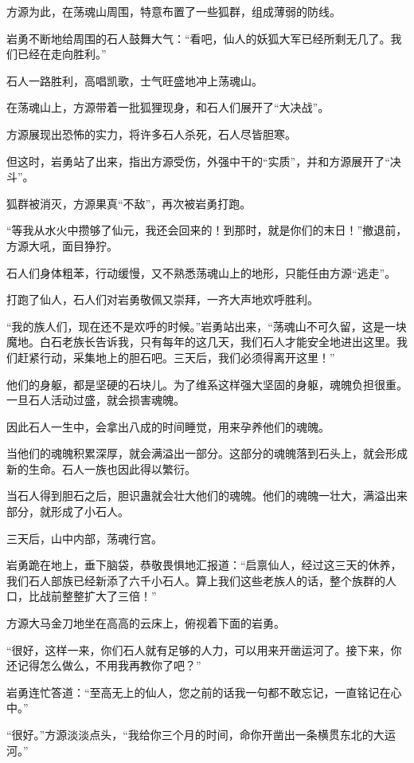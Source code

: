\begin{this_body}
方源为此，在荡魂山周围，特意布置了一些狐群，组成薄弱的防线。

岩勇不断地给周围的石人鼓舞大气：“看吧，仙人的妖狐大军已经所剩无几了。我们已经在走向胜利。”

石人一路胜利，高唱凯歌，士气旺盛地冲上荡魂山。

在荡魂山上，方源带着一批狐狸现身，和石人们展开了“大决战”。

方源展现出恐怖的实力，将许多石人杀死，石人尽皆胆寒。

但这时，岩勇站了出来，指出方源受伤，外强中干的“实质”，并和方源展开了“决斗”。

狐群被消灭，方源果真“不敌”，再次被岩勇打跑。

“等我从水火中攒够了仙元，我还会回来的！到那时，就是你们的末日！”撤退前，方源大吼，面目狰狞。

石人们身体粗苯，行动缓慢，又不熟悉荡魂山上的地形，只能任由方源“逃走”。

打跑了仙人，石人们对岩勇敬佩又崇拜，一齐大声地欢呼胜利。

“我的族人们，现在还不是欢呼的时候。”岩勇站出来，“荡魂山不可久留，这是一块魔地。白石老族长告诉我，只有每年的这几天，我们石人才能安全地进出这里。我们赶紧行动，采集地上的胆石吧。三天后，我们必须得离开这里！”

他们的身躯，都是坚硬的石块儿。为了维系这样强大坚固的身躯，魂魄负担很重。一旦石人活动过盛，就会损害魂魄。

因此石人一生中，会拿出八成的时间睡觉，用来孕养他们的魂魄。

当他们的魂魄积累深厚，就会满溢出一部分。这部分的魂魄落到石头上，就会形成新的生命。石人一族也因此得以繁衍。

当石人得到胆石之后，胆识蛊就会壮大他们的魂魄。他们的魂魄一壮大，满溢出来部分，就形成了小石人。

三天后，山中内部，荡魂行宫。

岩勇跪在地上，垂下脑袋，恭敬畏惧地汇报道：“启禀仙人，经过这三天的休养，我们石人部族已经新添了六千小石人。算上我们这些老族人的话，整个族群的人口，比战前整整扩大了三倍！”

方源大马金刀地坐在高高的云床上，俯视着下面的岩勇。

“很好，这样一来，你们石人就有足够的人力，可以用来开凿运河了。接下来，你还记得怎么做么，不用我再教你了吧？”

岩勇连忙答道：“至高无上的仙人，您之前的话我一句都不敢忘记，一直铭记在心中。”

“很好。”方源淡淡点头，“我给你三个月的时间，命你开凿出一条横贯东北的大运河。”


\end{this_body}
